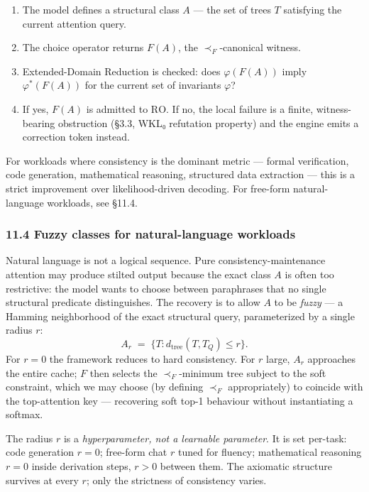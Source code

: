 \documentclass[
  11pt,
]{article}
\providecommand{\tightlist}{%
  \setlength{\itemsep}{0pt}\setlength{\parskip}{0pt}}
\begin{document}
\begin{enumerate}
\def\labelenumi{\arabic{enumi}.}
\tightlist
\item
  The model defines a structural class \(A\) --- the set of trees \(T\)
  satisfying the current attention query.
\item
  The choice operator returns \(F(A)\), the \(\prec_F\)-canonical
  witness.
\item
  Extended-Domain Reduction is checked: does \(\varphi(F(A))\) imply
  \(\varphi^*(F(A))\) for the current set of invariants \(\varphi\)?
\item
  If yes, \(F(A)\) is admitted to \(\mathrm{RO}\). If no, the local
  failure is a finite, witness-bearing obstruction (§3.3, WKL₀
  refutation property) and the engine emits a correction token instead.
\end{enumerate}

For workloads where consistency is the dominant metric --- formal
verification, code generation, mathematical reasoning, structured data
extraction --- this is a strict improvement over likelihood-driven
decoding. For free-form natural-language workloads, see §11.4.

\hypertarget{fuzzy-classes-for-natural-language-workloads}{%
\subsubsection{11.4 Fuzzy classes for natural-language
workloads}\label{fuzzy-classes-for-natural-language-workloads}}

Natural language is not a logical sequence. Pure consistency-maintenance
attention may produce stilted output because the exact class \(A\) is
often too restrictive: the model wants to choose between paraphrases
that no single structural predicate distinguishes. The recovery is to
allow \(A\) to be \emph{fuzzy} --- a Hamming neighborhood of the exact
structural query, parameterized by a single radius \(r\):
\[A_r \;=\; \{T : d_{\mathrm{tree}}(T, T_Q) \le r\}.\] For \(r = 0\) the
framework reduces to hard consistency. For \(r\) large, \(A_r\)
approaches the entire cache; \(F\) then selects the \(\prec_F\)-minimum
tree subject to the soft constraint, which we may choose (by defining
\(\prec_F\) appropriately) to coincide with the top-attention key ---
recovering soft top-1 behaviour without instantiating a softmax.

The radius \(r\) is a \emph{hyperparameter, not a learnable parameter}.
It is set per-task: code generation \(r = 0\); free-form chat \(r\)
tuned for fluency; mathematical reasoning \(r = 0\) inside derivation
steps, \(r > 0\) between them. The axiomatic structure survives at every
\(r\); only the strictness of consistency varies.
\end{document}
